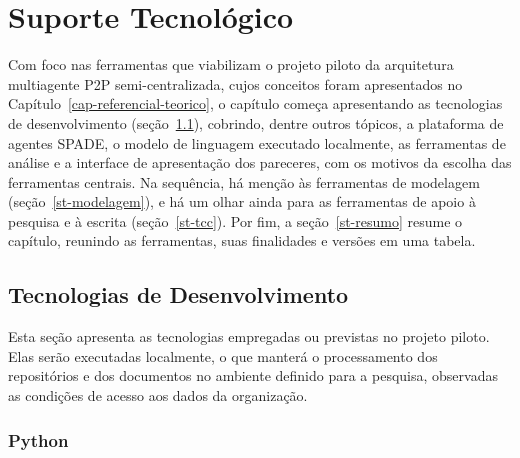 
\chapter{Suporte Tecnológico}
\label{cap-suporte-tecnologico}

Com foco nas ferramentas que viabilizam o projeto piloto da arquitetura multiagente P2P semi-centralizada, cujos conceitos foram apresentados no Capítulo~\ref{cap-referencial-teorico}, o capítulo começa apresentando as tecnologias de desenvolvimento (seção~\ref{st-desenvolvimento}), cobrindo, dentre outros tópicos, a plataforma de agentes SPADE, o modelo de linguagem executado localmente, as ferramentas de análise e a interface de apresentação dos pareceres, com os motivos da escolha das ferramentas centrais. Na sequência, há menção às ferramentas de modelagem (seção~\ref{st-modelagem}), e há um olhar ainda para as ferramentas de apoio à pesquisa e à escrita (seção~\ref{st-tcc}). Por fim, a seção~\ref{st-resumo} resume o capítulo, reunindo as ferramentas, suas finalidades e versões em uma tabela.

\section{Tecnologias de Desenvolvimento}
\label{st-desenvolvimento}

Esta seção apresenta as tecnologias empregadas ou previstas no projeto piloto. Elas serão executadas localmente, o que manterá o processamento dos repositórios e dos documentos no ambiente definido para a pesquisa, observadas as condições de acesso aos dados da organização.

\subsection{Python}
\label{st-python}

